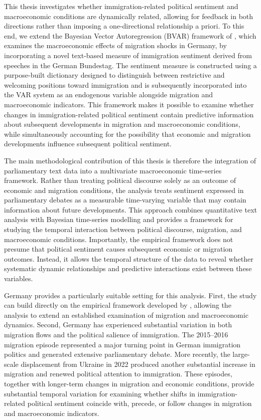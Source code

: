 \documentclass[12pt]{scrartcl}
\numberwithin{equation}{section}				%
\begin{document}
    This thesis investigates whether immigration-related political sentiment and macroeconomic conditions are dynamically related, allowing for feedback in both directions rather than imposing a one-directional relationship a priori. To this end, we extend the Bayesian Vector Autoregression (BVAR) framework of \parencite{maffei2021does}, which examines the macroeconomic effects of migration shocks in Germany, by incorporating a novel text-based measure of immigration sentiment derived from speeches in the German Bundestag. The sentiment measure is constructed using a purpose-built dictionary designed to distinguish between restrictive and welcoming positions toward immigration and is subsequently incorporated into the VAR system as an endogenous variable alongside migration and macroeconomic indicators. This framework makes it possible to examine whether changes in immigration-related political sentiment contain predictive information about subsequent developments in migration and macroeconomic conditions, while simultaneously accounting for the possibility that economic and migration developments influence subsequent political sentiment.
    
    The main methodological contribution of this thesis is therefore the integration of parliamentary text data into a multivariate macroeconomic time-series framework. Rather than treating political discourse solely as an outcome of economic and migration conditions, the analysis treats sentiment expressed in parliamentary debates as a measurable time-varying variable that may contain information about future developments. This approach combines quantitative text analysis with Bayesian time-series modelling and provides a framework for studying the temporal interaction between political discourse, migration, and macroeconomic conditions. Importantly, the empirical framework does not presume that political sentiment causes subsequent economic or migration outcomes. Instead, it allows the temporal structure of the data to reveal whether systematic dynamic relationships and predictive interactions exist between these variables.
    
    Germany provides a particularly suitable setting for this analysis. First, the study can build directly on the empirical framework developed by \parencite{maffei2021does}, allowing the analysis to extend an established examination of migration and macroeconomic dynamics. Second, Germany has experienced substantial variation in both migration flows and the political salience of immigration. The 2015--2016 migration episode represented a major turning point in German immigration politics and generated extensive parliamentary debate. More recently, the large-scale displacement from Ukraine in 2022 produced another substantial increase in migration and renewed political attention to immigration. These episodes, together with longer-term changes in migration and economic conditions, provide substantial temporal variation for examining whether shifts in immigration-related political sentiment coincide with, precede, or follow changes in migration and macroeconomic indicators.
    
\end{document}
